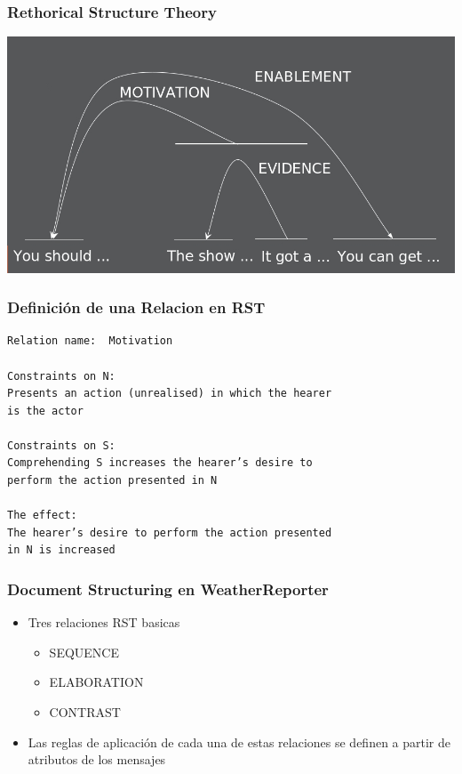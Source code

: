 \documentclass[compress,color=usenames]{beamer}
\begin{document}
\begin{frame}
\frametitle{Rethorical Structure Theory}

\begin{center}
\includegraphics[scale=.47]{pics/pic8.jpg}
\end{center}

\end{frame}

\begin{frame}[fragile]
\frametitle{Definici\'on de una Relacion en RST}

\begin{verbatim}
Relation name:  Motivation

Constraints on N:
Presents an action (unrealised) in which the hearer 
is the actor

Constraints on S:
Comprehending S increases the hearer’s desire to 
perform the action presented in N

The effect:
The hearer’s desire to perform the action presented 
in N is increased
\end{verbatim}

\end{frame}


\begin{frame}
\frametitle{Document Structuring en WeatherReporter}

\begin{itemize}
\item Tres relaciones RST basicas
\begin{itemize}
\item SEQUENCE
\item ELABORATION
\item CONTRAST
\end{itemize}

\item Las reglas de aplicaci\'on de cada una de estas relaciones 
se definen a partir de atributos de los mensajes
\end{itemize}
\end{frame}
\end{document}
